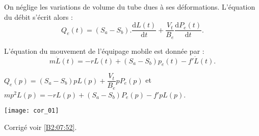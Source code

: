 On néglige les variations de volume du tube dues à ses déformations. L’équation du débit s’écrit alors :
	$$Q_e (t)=(S_a-S_b ).\dfrac{\text{d}L(t)}{\text{d}t}+\dfrac{V_t}{B_e}  \dfrac{\text{d}P_e (t)}{\text{d}t}.$$

L’équation du mouvement de l’équipage mobile est donnée par : 
$$
m\ddot{L}(t)=-rL(t)+\left(S_a-S_b \right)p_e(t)-f'\dot{L}(t).
$$
\fi

\ifprof

$Q_e (p)=(S_a-S_b )p L(p)+\dfrac{V_t}{B_e}  p P_e(p)$ et 
$mp^2{L}(p)=-rL(p)+\left(S_a-S_b \right)P_e(p)-f'p{L}(p)$.

\else

\fi

\ifprof

\else
\fi

\ifprof
\texttt{[image: cor\_01]}
\else
\begin{center}
\end{center}
\fi
 

\ifprof
\else
\begin{flushright}
\footnotesize{Corrigé  voir \ref{B2:07:52}.}
\end{flushright}%
\fi